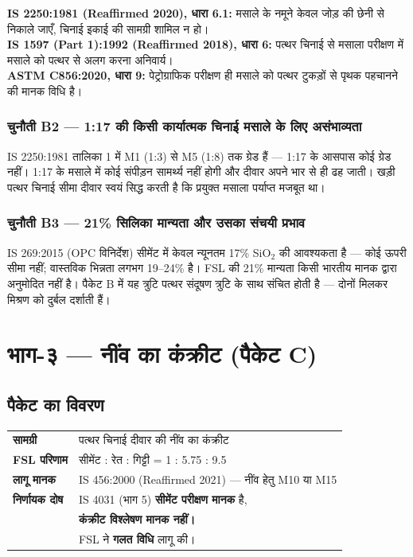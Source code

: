 \documentclass[12pt, a4paper]{article}
\begin{document}
\begin{standardbox}
\textbf{IS 2250:1981 (Reaffirmed 2020), धारा 6.1:} मसाले के नमूने केवल जोड़ की छेनी से निकाले जाएँ, चिनाई इकाई की सामग्री शामिल न हो।\\
\textbf{IS 1597 (Part 1):1992 (Reaffirmed 2018), धारा 6:} पत्थर चिनाई से मसाला परीक्षण में मसाले को पत्थर से अलग करना अनिवार्य।\\
\textbf{ASTM C856:2020, धारा 9:} पेट्रोग्राफिक परीक्षण ही मसाले को पत्थर टुकड़ों से पृथक पहचानने की मानक विधि है।
\end{standardbox}

\subsubsection{चुनौती B2 --- 1:17 की किसी कार्यात्मक चिनाई मसाले के लिए असंभाव्यता}

IS 2250:1981 तालिका 1 में M1 (1:3) से M5 (1:8) तक ग्रेड हैं --- 1:17 के आसपास कोई ग्रेड नहीं। 1:17 के मसाले में कोई संपीड़न सामर्थ्य नहीं होगी और दीवार अपने भार से ही ढह जाती। खड़ी पत्थर चिनाई सीमा दीवार स्वयं सिद्ध करती है कि प्रयुक्त मसाला पर्याप्त मजबूत था।

\subsubsection{चुनौती B3 --- 21\% सिलिका मान्यता और उसका संचयी प्रभाव}

IS 269:2015 (OPC विनिर्देश) सीमेंट में केवल न्यूनतम 17\% SiO$_2$ की आवश्यकता है --- कोई ऊपरी सीमा नहीं; वास्तविक भिन्नता लगभग 19--24\% है। FSL की 21\% मान्यता किसी भारतीय मानक द्वारा अनुमोदित नहीं है। पैकेट B में यह त्रुटि पत्थर संदूषण त्रुटि के साथ संचित होती है --- दोनों मिलकर मिश्रण को दुर्बल दर्शाती हैं।

\section{भाग-३ --- नींव का कंक्रीट (पैकेट C)}

\subsection{पैकेट का विवरण}

\begin{center}
\begin{tabular}{|l|l|}
  \hline
  \textbf{सामग्री} & पत्थर चिनाई दीवार की नींव का कंक्रीट \\
  \textbf{FSL परिणाम} & सीमेंट : रेत : गिट्टी = 1 : 5.75 : 9.5 \\
  \textbf{लागू मानक} & IS 456:2000 (Reaffirmed 2021) --- नींव हेतु M10 या M15 \\
  \textbf{निर्णायक दोष} & IS 4031 (भाग 5) \textbf{सीमेंट परीक्षण मानक} है, \\
                        & \textbf{कंक्रीट विश्लेषण मानक नहीं।}\\
                        & FSL ने \textbf{गलत विधि} लागू की। \\
  \hline
\end{tabular}
\end{center}
\end{document}
